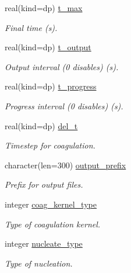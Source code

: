 \begin{DoxyCompactItemize}
\item 
real(kind=dp) \mbox{\hyperlink{structpmc__run__part_1_1run__part__opt__t_a2b13721dad1766fe198a494fe24675c4}{t\+\_\+max}}
\begin{DoxyCompactList}\small\item\em Final time (s). \end{DoxyCompactList}\item 
real(kind=dp) \mbox{\hyperlink{structpmc__run__part_1_1run__part__opt__t_a14beff5adc3dcd522e031162795e33ee}{t\+\_\+output}}
\begin{DoxyCompactList}\small\item\em Output interval (0 disables) (s). \end{DoxyCompactList}\item 
real(kind=dp) \mbox{\hyperlink{structpmc__run__part_1_1run__part__opt__t_a50b02179bf410d8f29a73d9d3eecb5dc}{t\+\_\+progress}}
\begin{DoxyCompactList}\small\item\em Progress interval (0 disables) (s). \end{DoxyCompactList}\item 
real(kind=dp) \mbox{\hyperlink{structpmc__run__part_1_1run__part__opt__t_a3b9e6fc117c21cc904e8caec367af627}{del\+\_\+t}}
\begin{DoxyCompactList}\small\item\em Timestep for coagulation. \end{DoxyCompactList}\item 
character(len=300) \mbox{\hyperlink{structpmc__run__part_1_1run__part__opt__t_a32fda64f8eba8efa6a7eae68a3c71674}{output\+\_\+prefix}}
\begin{DoxyCompactList}\small\item\em Prefix for output files. \end{DoxyCompactList}\item 
integer \mbox{\hyperlink{structpmc__run__part_1_1run__part__opt__t_af457b554785adb75bc54d413bc427ec8}{coag\+\_\+kernel\+\_\+type}}
\begin{DoxyCompactList}\small\item\em Type of coagulation kernel. \end{DoxyCompactList}\item 
integer \mbox{\hyperlink{structpmc__run__part_1_1run__part__opt__t_acfec0c3d7ec6e21ecfd3e325a3da7825}{nucleate\+\_\+type}}
\begin{DoxyCompactList}\small\item\em Type of nucleation. \end{DoxyCompactList}\item 

\end{DoxyCompactItemize}

